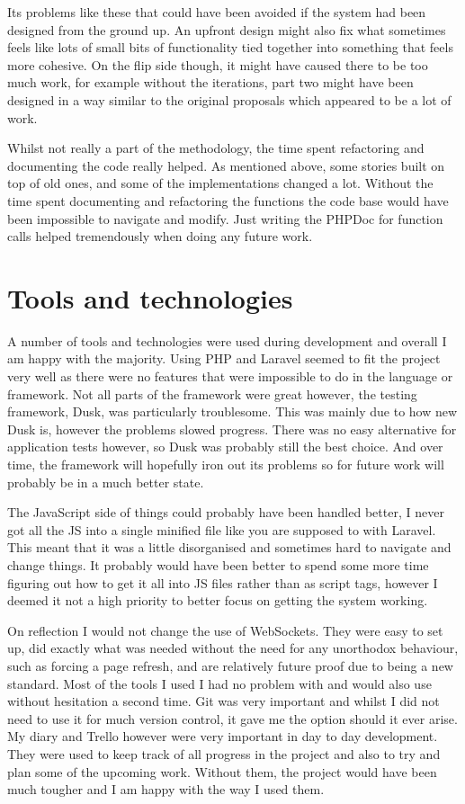 Its problems like these that could have been avoided if the system had been designed from the ground up. An upfront design might also fix what sometimes feels like lots of small bits of functionality tied together into something that feels more cohesive. On the flip side though, it might have caused there to be too much work, for example without the iterations, part two might have been designed in a way similar to the original proposals which appeared to be a lot of work.

Whilst not really a part of the methodology, the time spent refactoring and documenting the code really helped. As mentioned above, some stories built on top of old ones, and some of the implementations changed a lot. Without the time spent documenting and refactoring the functions the code base would have been impossible to navigate and modify. Just writing the PHPDoc for function calls helped tremendously when doing any future work.

\section{Tools and technologies}
A number of tools and technologies were used during development and overall I am happy with the majority. Using PHP and Laravel seemed to fit the project very well as there were no features that were impossible to do in the language or framework. Not all parts of the framework were great however, the testing framework, Dusk, was particularly troublesome. This was mainly due to how new Dusk is, however the problems slowed progress. There was no easy alternative for application tests however, so Dusk was probably still the best choice. And over time, the framework will hopefully iron out its problems so for future work will probably be in a much better state. 

The JavaScript side of things could probably have been handled better, I never got all the JS into a single minified file like you are supposed to with Laravel. This meant that it was a little disorganised and sometimes hard to navigate and change things. It probably would have been better to spend some more time figuring out how to get it all into JS files rather than as script tags, however I deemed it not a high priority to better focus on getting the system working.

On reflection I would not change the use of WebSockets. They were easy to set up, did exactly what was needed without the need for any unorthodox behaviour, such as forcing a page refresh, and are relatively future proof due to being a new standard. Most of the tools I used I had no problem with and would also use without hesitation a second time. Git was very important and whilst I did not need to use it for much version control, it gave me the option should it ever arise. My diary and Trello however were very important in day to day development. They were used to keep track of all progress in the project and also to try and plan some of the upcoming work. Without them, the project would have been much tougher and I am happy with the way I used them.

